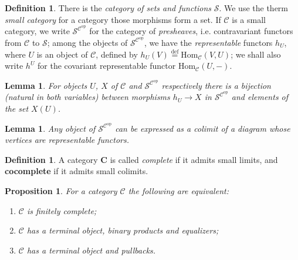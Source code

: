 \documentclass[10]{article}
\theoremstyle{plain}
\newtheorem{lemma}[prop]{Lemma}
\newtheorem{proposition}[prop]{Proposition}
\theoremstyle{definition}
\newtheorem{defn}[prop]{Definition}%
\theoremstyle{definition}
\newtheorem{definition}[prop]{Definition}
\numberwithin{equation}{section}
\newcommand{\7}{\dagger}                     %
\newcommand{\8}{\bullet}                     %
\renewcommand{\.}{\cdot}                     %
\renewcommand{\:}{\colon}                    %
\newcommand{\bydef}{\stackrel{\mathrm{def}}{=}}          %
\renewcommand{\:}{\colon}           %
\newcommand{\Hom}{\mathrm{Hom}}       %
\begin{document}
\begin{appendices}
			
			
			\begin{defn}\label{sets_cat_defn}\cite{johnstone:topos}
				There is the \textit{category  of sets and functions} $\mathscr{S}$. We use the therm \textit{small category} for a category those morphisms form a set. If $\mathscr C$ is a small category, we write $\mathscr{S}^{\mathscr{C}^{\mathrm{op}}}$ for the category of \textit{presheaves}, i.e. contravariant functors from $\mathscr{C}$ to $\mathscr{S}$; among the objects of $\mathscr{S}^{\mathscr{C}^{\mathrm{op}}}$, we have the \textit{representable} functors $h_U$, where $U$ is an object of $\mathscr C$, defined by $h_U\left( V\right) \bydef \Hom_{\mathscr{C}}\left( V, U\right)$; we shall also write $h^U$ for the covariant representable  functor $\Hom_{\mathscr{C}}\left( U, -\right)$.
			\end{defn}
			\begin{lemma}\label{repr_func_lem}\cite{johnstone:topos}
				For objects $U$, $X$ of $\mathscr{C}$ and $\mathscr{S}^{\mathscr{C}^{\mathrm{op}}}$ respectively there is a bijection (natural in both variables) between morphisms $h_U \to X$ in $\mathscr{S}^{\mathscr{C}^{\mathrm{op}}}$ and elements of the set $X\left(U \right)$. 
			\end{lemma}
			\begin{lemma}\label{to_set_lem}\cite{johnstone:topos}
				Any object of $\mathscr{S}^{\mathscr{C}^{\mathrm{op}}}$ can be expressed as a colimit of a diagram whose vertices are representable functors.
			\end{lemma}
			
			\begin{definition}
				\label{(co)complete_defn}A category $\mathbf{C}$ is called \textit{complete}
				if it admits small limits, and \textbf{cocomplete} if it admits small
				colimits.
			\end{definition}
			
			
			\begin{proposition}\cite{borce_cat}\label{fin_lim_prop}
				For a category $\mathscr C$ 
				the following are equivalent:
				\begin{enumerate}
					\item $\mathscr C$
					is finitely complete; 
					
					\item $\mathscr C$
					has a terminal object, binary products and equalizers;
					
					\item $\mathscr C$
					has a terminal object and pullbacks.
					

\end{enumerate}
\end{proposition}
\end{appendices}
\end{document}
